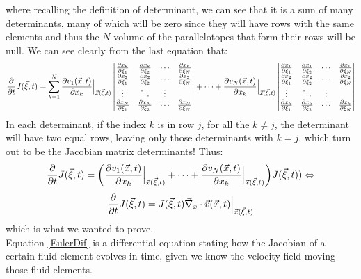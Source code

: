 \documentclass[11pt, a4paper]{article} %
\DeclareRobustCommand{\mybox}[2][gray!10]{%
\begin{tcolorbox}[   %
        left=0.2cm,
        right=0.2cm,
        top=0.15cm,
        bottom=0.15cm,
        colback=#1,
        colframe=#1,
        width=\dimexpr\textwidth\relax, 
        enlarge left by=0mm,
        boxsep=5pt,
        arc=0pt,outer arc=0pt,
        ]
        #2
\end{tcolorbox}
}
\begin{document}
\mybox{
where recalling the definition of determinant, we can see that it is a sum of many determinants, many of which will be zero since they will have rows with the same elements and thus the $N$-volume of the parallelotopes that form their rows will be null. We can see clearly from the last equation that:
\begin{equation}
\pdv{}{t}J(\vec{\xi},t)=\sum_{k=1}^N \pdv{v_1(\vec{x},t)}{x_k}\Big\rvert_{\vec{x}(\vec{\xi},t)} \begin{vmatrix}
\pdv{x_k}{\xi_{1}}&\pdv{x_k}{\xi_{2}} &\cdots &\pdv{x_k}{\xi_{N}}\\
\pdv{x_2}{\xi_{1}}&\pdv{x_2}{\xi_{2}} &\cdots &\pdv{x_2}{\xi_{N}}\\
\vdots & \ddots & \vdots\\
\pdv{x_N}{\xi_{1}}&\pdv{x_N}{\xi_{2}} &\cdots &\pdv{x_N}{\xi_{N}}
\end{vmatrix}+\cdots+
\pdv{v_N(\vec{x},t)}{x_k}\Big\rvert_{\vec{x}(\vec{\xi},t)} \begin{vmatrix}
\pdv{x_1}{\xi_{1}}&\pdv{x_1}{\xi_{2}} &\cdots &\pdv{x_1}{\xi_{N}}\\
\pdv{x_2}{\xi_{1}}&\pdv{x_2}{\xi_{2}} &\cdots &\pdv{x_2}{\xi_{N}}\\
\vdots & \ddots & \vdots\\
\pdv{x_k}{\xi_{1}}&\pdv{x_k}{\xi_{2}} &\cdots &\pdv{x_k}{\xi_{N}}
\end{vmatrix}
\end{equation}
In each determinant, if the index $k$ is in row $j$, for all the $k\neq j$, the determinant will have two equal rows, leaving only those determinants with $k=j$, which turn out to be the Jacobian matrix determinants! Thus:
\begin{equation}
\pdv{}{t}J(\vec{\xi},t)=\qty(\pdv{v_1(\vec{x},t)}{x_k}\Big\rvert_{\vec{x}(\vec{\xi},t)}+\cdots+\pdv{v_N(\vec{x},t)}{x_k}\Big\rvert_{\vec{x}(\vec{\xi},t)}) J(\vec{\xi},t))\Leftrightarrow
\end{equation}
\begin{equation}\label{EulerDif}
\pdv{}{t}J(\vec{\xi},t)=J(\vec{\xi},t)\vec{\nabla}_x\cdot\vec{v}(\vec{x},t)\Big\rvert_{\vec{x}(\vec{\xi},t)}
\end{equation}
which is what we wanted to prove.\\

Equation \eqref{EulerDif} is a differential equation stating how the Jacobian of a certain fluid element evolves in time, given we know the velocity field moving those fluid elements.\\

}
\end{document}
